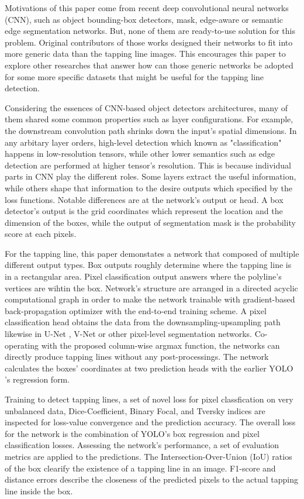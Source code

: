 \documentclass[default,pdflatex,iicol]{sn-jnl}%
\begin{document}
Motivations of this paper come from recent deep convolutional neural networks (CNN), such as object bounding-box detectors, mask, edge-aware or semantic edge segmentation networks. But, none of them are ready-to-use solution for this problem. Original contributors of those works designed their networks to fit into more generic data than the tapping line images. This encourages this paper to explore other researches that answer how can those generic networks be adopted for some more specific datasets that might be useful for the tapping line detection.

Considering the essences of CNN-based object detectors architectures, many of them shared some common properties such as layer configurations. For example, the downstream convolution path shrinks down the input's spatial dimensions. In any arbitary layer orders, high-level detection which known as "classification" happens in low-resolution tensors, while other lower semantics such as edge detection are performed at higher tensor's resolution. This is because individual parts in CNN play the different roles. Some layers extract the useful information, while others shape that information to the desire outputs which specified by the loss functions. Notable differences are at the network's output or head. A box detector's output is the grid coordinates which represent the location and the dimension of the boxes, while the output of segmentation mask is the probability score at each pixels.

For the tapping line, this paper demonstates a network that composed of multiple different output types. Box outputs roughly determine where the tapping line is in a rectangular area. Pixel classification output answers where the polyline's vertices are wihtin the box. Network's structure are arranged in a directed acyclic computational graph in order to make the network trainable with gradient-based back-propagation optimizer with the end-to-end training scheme. A pixel classification head obtains the data from the downsampling-upsampling path likewise in U-Net \cite{unet}, V-Net \cite{vnet} or other pixel-level segmentation networks. Co-operating with the proposed column-wise argmax function, the networks can directly produce tapping lines without any post-processings. The network calculates the boxes' coordinates at two prediction heads with the earlier YOLO \cite{redmonyolov2} 's regression form.

Training to detect tapping lines, a set of novel loss for pixel classfication on very unbalanced data, Dice-Coefficient, Binary Focal, and Tversky indices are inspected for loss-value convergence and the prediction accuracy. The overall loss for the network is the combination of YOLO's box regression and pixel classification losses. Assessing the network's performance, a set of evaluation metrics are applied to the predictions. The Intersection-Over-Union (IoU) ratios of the box clearify the existence of a tapping line in an image. F1-score and distance errors describe the closeness of the predicted pixels to the actual tapping line inside the box.
\end{document}
